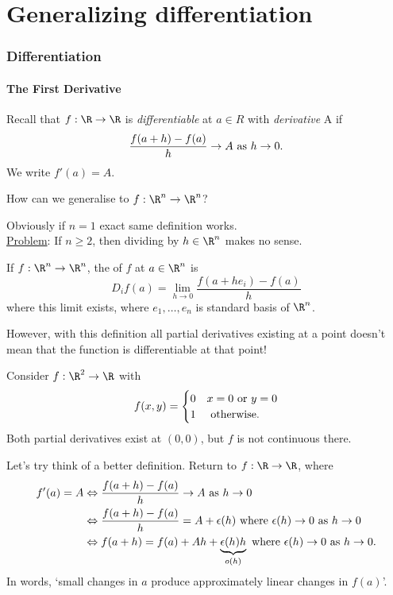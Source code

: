 \part{Generalizing differentiation}
\section{Differentiation}

\subsection{The First Derivative}
Recall that $f:\R\to \R$ is \emph{differentiable} at $a\in R$ with \emph{derivative} A if \[ \frac{f(a+h)-f(a)}{h}\to A \textup{ as } h\to 0.\] We write $f'(a) = A$.

\begin{question}
    How can we generalise to $f:\R^n\to \R^n$?
\end{question} 
Obviously if $n = 1$ exact same definition works. \\
\underline{Problem}: If $n\geq 2$, then dividing by $h\in \R^n$ makes no sense.

\begin{definition}
    If $f: \R^n\to \R^n$, the  of $f$ at $a\in \R^n$ is \[ D_i f(a) = \lim_{h\to 0} \frac{f(a+he_i)-f(a)}{h}\]
    where this limit exists, where $e_1,\dots ,e_n$ is standard basis of $\R^n$.
\end{definition}

However, with this definition all partial derivatives existing at a point doesn't mean that the function is differentiable at that point!
\begin{example}
    Consider $f:\R^2\to \R$ with 
    \[
    f(x,y) = \begin{cases}
    0 & x = 0 \textup{ or } y = 0\\
    1 & \textup{ otherwise.}
    \end{cases}
    \]
    Both partial derivatives exist at $(0,0)$, but $f$ is not continuous there.
\end{example}

Let's try think of a better definition. Return to $f:\R\to \R$, where
\begin{align*}
    f'(a) = A &\Leftrightarrow \frac{f(a+h) - f(a)}{h}\to A \textup{ as }h\to 0\\
    &\Leftrightarrow \frac{f(a+h) - f(a)}{h} = A+\epsilon(h) \textup{ where } \epsilon(h)\to 0 \textup{ as } h\to 0\\
    &\Leftrightarrow f(a+h) = f(a) + Ah + \underbrace{\epsilon(h)h}_{o(h)} \textup{ where } \epsilon(h)\to 0 \textup{ as } h\to 0.
\end{align*}
In words, `small changes in $a$ produce approximately linear changes in $f(a)$'.

